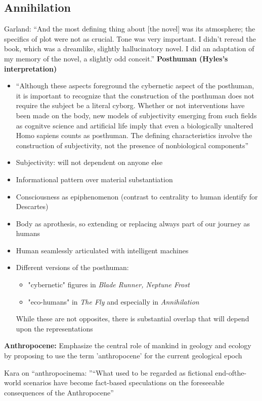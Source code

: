 \documentclass[11pt,fleqn]{book}
\begin{document}
\subsection{Annihilation}
Garland: \enquote{And the most defining thing about
[the novel] was its atmosphere;
the specifics of plot were not as
crucial. Tone was very important.
I didn’t reread the book, which
was a dreamlike, slightly
hallucinatory novel. I did an
adaptation of my memory of the
novel, a slightly odd conceit.}
\textbf{Posthuman (Hyles's interpretation)}
\begin{itemize}
    \item \enquote{Although these aspects foreground the cybernetic aspect of the posthuman, it is important
to recognize that the construction of the posthuman does not require the subject be a literal
cyborg. Whether or not interventions have been made on the body, new models of
subjectivity emerging from such fields as cognitve science and artificial life imply that even a
biologically unaltered Homo sapiens counts as posthuman. The defining characteristics
involve the construction of subjectivity, not the presence of nonbiological components}
    \item Subjectivity: will not dependent on anyone else
    \item Informational pattern over material substantiation
    \item Consciousness as epiphenomenon (contrast to centrality to human identify for Descartes)
    \item Body as aprothesis, so extending or replacing always part of our journey as humans
    \item Human seamlessly articulated with intelligent machines
    \item Different versions of the posthuman:
    \begin{itemize}
        \item "cybernetic" figures in \textit{Blade Runner, Neptune Frost}
        \item "eco-humans" in \textit{The Fly} and especially in \textit{Annihilation} 
    \end{itemize} While these are not opposites, there is substantial overlap that will depend upon the representations
\end{itemize}
\textbf{Anthropocene: }Emphasize the central role of mankind in geology and ecology by proposing to use the term 'anthropocene' for the current geological epoch

Kara on \enquote{anthropocinema: }\enquote{What used to be regarded as fictional end-ofthe-world scenarios have become fact-based
speculations on the foreseeable consequences
of the Anthropocene}
\end{document}
